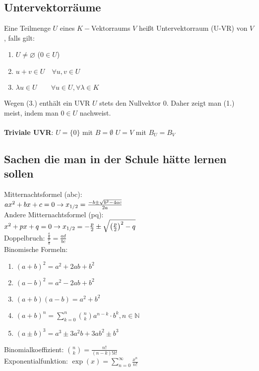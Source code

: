 \documentclass[6pt,a4paper]{scrartcl}
\newcommand{\enbrace}[1]{\ensuremath{\left(#1\right)}}
\newcommand{\N}{\ensuremath{\mathbb N}}
\begin{document}
\begin{multicols}{4}
\subsection{Untervektorräume}
Eine Teilmenge $U$ eines $K-$Vektorraums $V$ heißt Untervektorraum (U-VR) von $V$, falls gilt:
\begin{enumerate}\itemsep0pt
\item $U\neq \varnothing$ \qquad ($0\in U$)
\item $u+v\in U \quad \forall u,v\in U$
\item $\lambda u \in U \qquad \forall u\in U,\forall \lambda \in K$
\end{enumerate}
Wegen (3.) enthält ein UVR $U$ stets den Nullvektor $0$. Daher zeigt man (1.) meist, indem man $0\in U$ nachweist.\\
\\
\textbf{Triviale UVR}: $U=\{0\}$ mit $B = \emptyset$ \qquad $U=V$ mit $B_U=B_V$

\subsection{Sachen die man in der Schule hätte lernen sollen}
Mitternachtsformel (abc): \\
$a x^2 + bx + c = 0 \\
\rightarrow x_{1/2} = \frac{-b \pm \sqrt{b^2 - 4ac}}{2a}$ \\
Andere Mitternachtsformel (pq): \\
$x^2+p x+q=0 \\
\rightarrow x_{1/2} = -\frac{p}{2} \pm \sqrt{\enbrace{\frac{p}{2}}^2-q}$ \\
Doppelbruch: $\frac{\frac{a}{b}}{\frac{c}{d}}=\frac{a d}{b c}$ \\
Binomische Formeln:
\begin{enumerate}\itemsep-1pt
\item $(a+b)^2=a^2+2ab+b^2$
\item $(a-b)^2=a^2-2ab+b^2$
\item $(a+b)(a-b)=a^2+b^2$
\item $(a + b)^n = \sum_{k=0}^{n} \binom{n}{k} a^{n-k} \cdot b^k, n \in \N$
\item $(a \pm b)^3 = a^3 \pm 3 a^2 b + 3 a b^2 \pm b^3$
\end{enumerate}
Binomialkoeffizient: $\binom{n}{k} = \frac{n!}{(n-k)! k!}$ \\
Exponentialfunktion: $\exp(x) = \sum\limits_{n = 0}^\infty \frac{x^n}{n!}$ \\
\end{multicols}


\end{document}
